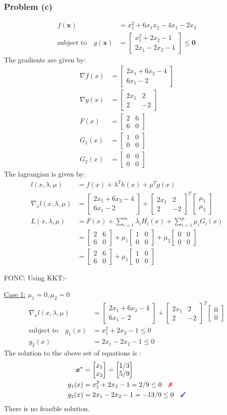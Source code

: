 \documentclass[a4paper,11pt]{article}
\newcommand{\V}[1]{\boldsymbol{#1}}
\newcommand{\mat}[1]{\begin{bmatrix}#1\end{bmatrix}}
\newcommand{\cmark}{{\color{blue}\text{\ding{51}}}}%
\newcommand{\xmark}{{\color{red}\text{\ding{55}}}}%
\begin{document}
\subsubsection*{Problem (c)}
\begin{align*}
 f(\V{x}) &= x_1^2+6x_1x_2-4x_1 -2x_2\\
 \text{subject to}\quad g(\V{x})&= \mat{x_1^2 +2x_2-1\\ 2x_1-2x_2-1} \leq \V{0}
\end{align*}
The gradients are given by:
\begin{align*}
 \nabla f(x) &= \mat{2x_1 +6x_2 -4\\ 6x_1 -2}\\
 \nabla g(x) &= \mat{2x_1 & 2\\ 2&  -2}\\
 F(x) &= \mat{2&6\\6&0}\\
 G_1(x) &= \mat{1 & 0\\ 0& 0}\\
 G_2(x) &= \mat{0 & 0\\ 0 &0}
\end{align*}
The lagrangian is given by:
\begin{align*}
 l(x,\lambda,\mu) &= f(x) + \lambda^Th(x) + \mu^Tg(x)\\
 \nabla_x l(x,\lambda,\mu) &=  \mat{2x_1 +6x_2 -4\\ 6x_1 -2} +
\mat{2x_1 & 2\\ 2&  -2}^T\mat{\mu_1\\ \mu_2}\\
L(x,\lambda,\mu)&= F(x) + \sum_{i=1}^{m}\lambda_i H_i(x) + \sum_{i=1}^{p}\mu_i G_i(x)\\
&= \mat{2&6\\6&0} + \mu_1\mat{1 & 0\\ 0& 0} + \mu_2\mat{0 & 0\\ 0& 0}\\
&= \mat{2&6\\6&0} + \mu_1\mat{1 & 0\\ 0& 0}
\end{align*}

\noindent FONC: Using KKT:-

\noindent\underline{Case 1:} $\mu_1=0, \mu_2=0$
\begin{align*}
 \nabla_x l(x,\lambda,\mu) &= \mat{2x_1 +6x_2 -4\\ 6x_1 -2} +
\mat{2x_1 & 2\\ 2&  -2}^T\mat{0\\ 0}\\
% 
 \text{subject to}\quad g_1(x)&=x_1^2 +2x_2-1 \leq 0\\
 g_2(x)&=2x_1-2x_2-1\leq 0
\end{align*}
The solution to the above set of equations is :
\begin{align*}
 \V{x}^*&=\mat{x_1\\x_2} = \mat{1/3\\5/9}\\
 g_1(x)&=x_1^2 +2x_2-1 =2/9\leq 0 \quad \xmark\\
 g_2(x)&=2x_1-2x_2-1 =-13/9\leq 0 \quad \cmark
\end{align*}
There is no feasible solution.
\end{document}
